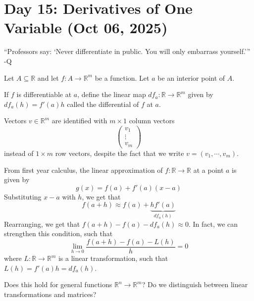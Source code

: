 \section{Day 15: Derivatives of One Variable (Oct 06, 2025)}

``Professors say: `Never differentiate in public. You will only embarrass yourself.''' -Q

Let $A \subseteq \mathbb{R}$ and let $f : A \to \mathbb{R}^m$ be a function. Let $a$ be an interior point of $A$. 
\begin{definition}[Differential]
    If $f$ is differentiable at $a$, define the linear map $d f_a: \mathbb{R} \to \mathbb{R}^m$ given by $d f_a(h) = f'(a)h$ called the differential of $f$ at $a$. 
\end{definition}

\begin{remark}
Vectors $v \in \mathbb{R}^m$ are identified with $m \times 1$  column vectors
\[
\begin{pmatrix}
v_1 \\ \vdots \\ v_m
\end{pmatrix}
\]
instead of $1 \times m$ row vectors, despite the fact that we write $v = (v_1, \cdots, v_m)$.
\end{remark}

From first year calculus, the linear approximation of $f: \mathbb{R} \to \mathbb{R}$ at a point $a$ is given by
\[
g(x) = f(a) + f'(a)(x - a)
\]
Substituting $x - a$ with $h$, we get that
\[
f(a + h) \approx f(a) + \underbrace{hf'(a)}_{df_a(h)}
\]
Rearranging, we get that $f(a+h) - f(a) - df_a(h) \approx 0$. In fact, we can strengthen this condition, such that
\[
\lim_{ h \to 0 } \frac{f(a+h) - f(a) - L(h)}{h} = 0
\]
where $L : \mathbb{R} \to \mathbb{R}^m$ is a linear transformation, such that $L(h) = f'(a)h = df_a(h)$. 

Does this hold for general functions $\mathbb{R}^n \to \mathbb{R}^m$? Do we distinguish between linear transformations and matrices?
